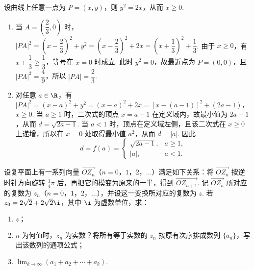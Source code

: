 \documentclass[UTF8,a4paper,oneside,11pt]{ctexbook}
\begin{document}
\begin{solution}
设曲线上任意一点为 \(P=(x,y)\)，则 \(y^2=2x\)，从而 \(x\geqslant0\).

\begin{enumerate}
\item 当 \(A=\left(\dfrac23,0\right)\) 时，
\(|PA|^2=\left(x-\dfrac23\right)^2+y^2=\left(x-\dfrac23\right)^2+2x=\left(x+\dfrac13\right)^2+\dfrac13\).
由于 \(x\geqslant0\)，有 \(x+\dfrac13\geqslant\dfrac13\)，等号在 \(x=0\) 时成立. 此时 \(y^2=0\)，故最近点为 \(P=(0,0)\)，且 \(|PA|^2=\dfrac49\)，所以 \(|PA|=\dfrac23\).
\item 对任意 \(a\in\R\)，有
\(|PA|^2=(x-a)^2+y^2=(x-a)^2+2x=\left[x-(a-1)\right]^2+(2a-1)\)，\(x\geqslant0\).
当 \(a\geqslant1\) 时，二次式的顶点 \(x=a-1\) 在定义域内，故最小值为 \(2a-1\)，从而 \(d=\sqrt{2a-1}\). 当 \(a<1\) 时，顶点在定义域左侧，且该二次式在 \(x\geqslant0\) 上递增，所以在 \(x=0\) 处取得最小值 \(a^2\)，从而 \(d=|a|\). 因此
\[
d=f(a)=
\begin{cases}
\sqrt{2a-1},&a\geqslant1,\\
|a|,&a<1.
\end{cases}
\]
\end{enumerate}
\end{solution}

\begin{problem}
设复平面上有一系列向量 \(\overrightarrow{OZ_n}\)（\(n=0\)，\(1\)，\(2\)，\(\dots\)）满足如下关系：将 \(\overrightarrow{OZ_n}\) 按逆时针方向旋转 \(\frac{3}{4}\pi\) 后，再把它的模变为原来的一半，得到 \(\overrightarrow{OZ_{n+1}}\). 记 \(\overrightarrow{OZ_n}\) 所对应的复数为 \(z_n\)（\(n=0\)，\(1\)，\(2\)，\(\dots\)），并设这一变换所对应的复数为 \(z\). 若 \(z_0=2\sqrt{2}+2\sqrt{2}\i\)，其中 \(\i\) 为虚数单位，求：

\begin{enumerate}
\item \(z\)；
\item \(n\) 为何值时，\(z_n\) 为实数？将所有等于实数的 \(z_n\) 按原有次序排成数列 \(\{a_n\}\)，写出该数列的通项公式；
\item \(\displaystyle\lim_{k\to\infty}\left(a_1+a_2+\cdots+a_k\right)\).
\end{enumerate}
\end{problem}
\end{document}
